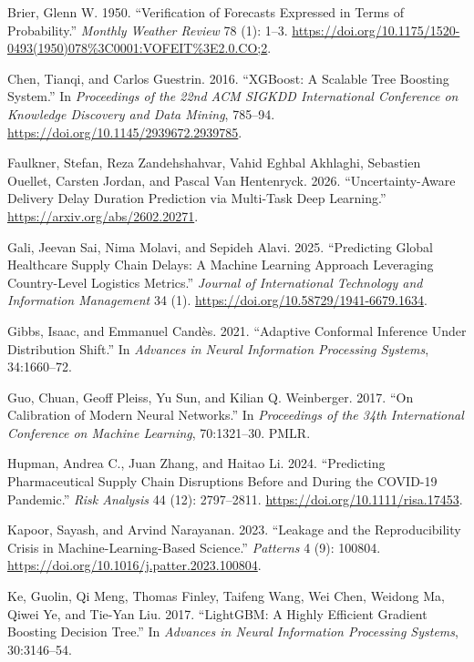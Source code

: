 \documentclass[
]{article}
\newlength{\cslhangindent}
\newenvironment{CSLReferences}[2] %
 {\begin{list}{}{%
  \setlength{\itemindent}{0pt}
  \setlength{\leftmargin}{0pt}
  \setlength{\parsep}{0pt}
  \ifodd #1
   \setlength{\leftmargin}{\cslhangindent}
   \setlength{\itemindent}{-1\cslhangindent}
  \fi
  \setlength{\itemsep}{#2\baselineskip}}}
 {\end{list}}
\begin{document}
\begin{CSLReferences}{1}{0}
Brier, Glenn W. 1950. {``Verification of Forecasts Expressed in Terms of
Probability.''} \emph{Monthly Weather Review} 78 (1): 1--3.
\url{https://doi.org/10.1175/1520-0493(1950)078\%3C0001:VOFEIT\%3E2.0.CO;2}.

Chen, Tianqi, and Carlos Guestrin. 2016. {``XGBoost: A Scalable Tree
Boosting System.''} In \emph{Proceedings of the 22nd ACM SIGKDD
International Conference on Knowledge Discovery and Data Mining},
785--94. \url{https://doi.org/10.1145/2939672.2939785}.

Faulkner, Stefan, Reza Zandehshahvar, Vahid Eghbal Akhlaghi, Sebastien
Ouellet, Carsten Jordan, and Pascal Van Hentenryck. 2026.
{``Uncertainty-Aware Delivery Delay Duration Prediction via Multi-Task
Deep Learning.''} \url{https://arxiv.org/abs/2602.20271}.

Gali, Jeevan Sai, Nima Molavi, and Sepideh Alavi. 2025. {``Predicting
Global Healthcare Supply Chain Delays: A Machine Learning Approach
Leveraging Country-Level Logistics Metrics.''} \emph{Journal of
International Technology and Information Management} 34 (1).
\url{https://doi.org/10.58729/1941-6679.1634}.

Gibbs, Isaac, and Emmanuel Candès. 2021. {``Adaptive Conformal Inference
Under Distribution Shift.''} In \emph{Advances in Neural Information
Processing Systems}, 34:1660--72.

Guo, Chuan, Geoff Pleiss, Yu Sun, and Kilian Q. Weinberger. 2017. {``On
Calibration of Modern Neural Networks.''} In \emph{Proceedings of the
34th International Conference on Machine Learning}, 70:1321--30. PMLR.

Hupman, Andrea C., Juan Zhang, and Haitao Li. 2024. {``Predicting
Pharmaceutical Supply Chain Disruptions Before and During the COVID-19
Pandemic.''} \emph{Risk Analysis} 44 (12): 2797--2811.
\url{https://doi.org/10.1111/risa.17453}.

Kapoor, Sayash, and Arvind Narayanan. 2023. {``Leakage and the
Reproducibility Crisis in Machine-Learning-Based Science.''}
\emph{Patterns} 4 (9): 100804.
\url{https://doi.org/10.1016/j.patter.2023.100804}.

Ke, Guolin, Qi Meng, Thomas Finley, Taifeng Wang, Wei Chen, Weidong Ma,
Qiwei Ye, and Tie-Yan Liu. 2017. {``LightGBM: A Highly Efficient
Gradient Boosting Decision Tree.''} In \emph{Advances in Neural
Information Processing Systems}, 30:3146--54.


\end{CSLReferences}
\end{document}
